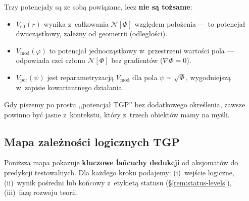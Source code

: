\begin{remark}\label{rem:A-potential-rel}
  Trzy potencja\l{}y s\k{a} ze sob\k{a} powi\k{a}zane, lecz \textbf{nie
  s\k{a} to\.zsame}:
  \begin{itemize}[nosep]
    \item $V_{\mathrm{eff}}(r)$ wynika z~ca\l{}kowania $\mathcal{N}[\Phi]$
      wzgl\k{e}dem po\l{}o\.zenia --- to potencja\l{} dwucz\k{a}stkowy,
      zale\.zny od geometrii (odleg\l{}o\'sci).
    \item $V_{\mathrm{mod}}(\varphi)$ to potencja\l{} jednocz\k{a}stkowy
      w~przestrzeni warto\'sci pola --- odpowiada czci cz\l{}onu
      $\mathcal{N}[\Phi]$ bez gradient\'ow ($\nabla\Phi = 0$).
    \item $V_{\mathrm{pot}}(\psi)$ jest reparametryzacj\k{a}
      $V_{\mathrm{mod}}$ dla pola $\psi = \sqrt\Phi$, wygodniejsz\k{a}
      w~zapisie kowariantnego dzia\l{}ania.
  \end{itemize}
  Gdy piszemy po prostu ,,potencja\l{} TGP'' bez dodatkowego
  okre\'slenia, zawsze powinno by\'c jasne z~kontekstu,
  kt\'ory z~trzech obiekt\'ow mamy na my\'sli.
\end{remark}

\subsection{Mapa zale\.zno\'sci logicznych TGP}\label{ssec:dependency-map}

Poni\.zsza mapa pokazuje \textbf{kluczowe \'la\'ncuchy dedukcji} od
aksjomat\'ow do predykcji testowalnych.
Dla ka\.zdego kroku podajemy: (i)~wej\'scie logiczne,
(ii)~wynik po\'sredni lub ko\'ncowy z~etykiet\k{a} statusu
(\S\ref{rem:status-levels}), (iii)~faz\k{e} rozwoju teorii.

